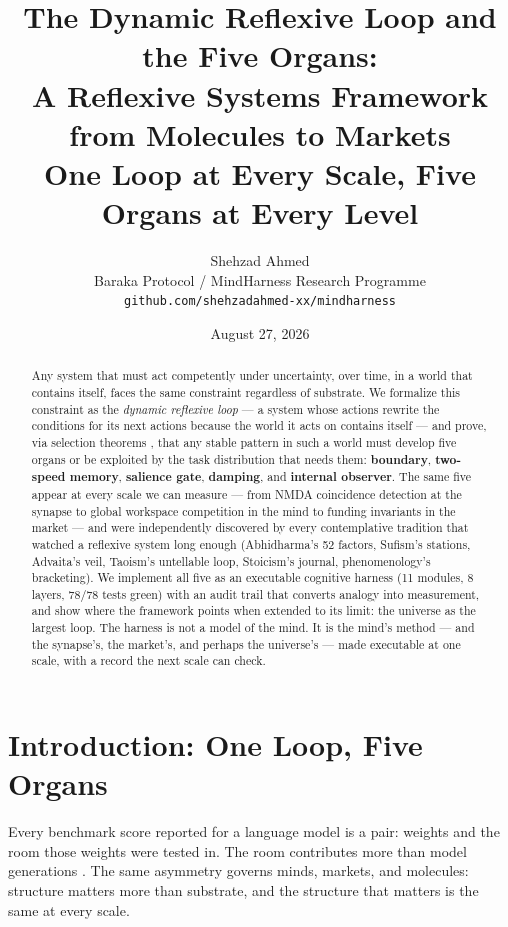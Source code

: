 \documentclass[11pt]{article}
\title{The Dynamic Reflexive Loop and the Five Organs:\\[4pt]
\Large A Reflexive Systems Framework from Molecules to Markets\\[6pt]
\normalsize One Loop at Every Scale, Five Organs at Every Level}
\author{Shehzad Ahmed \\ \small Baraka Protocol / MindHarness Research Programme \\ \small \texttt{github.com/shehzadahmed-xx/mindharness}}
\date{August 27, 2026}
\begin{document}
\maketitle

\begin{abstract}
Any system that must act competently under uncertainty, over time, in a world that contains itself, faces the same constraint regardless of substrate. We formalize this constraint as the \emph{dynamic reflexive loop} --- a system whose actions rewrite the conditions for its next actions because the world it acts on contains itself --- and prove, via selection theorems \citep{nayebi2026}, that any stable pattern in such a world must develop five organs or be exploited by the task distribution that needs them: \textbf{boundary}, \textbf{two-speed memory}, \textbf{salience gate}, \textbf{damping}, and \textbf{internal observer}. The same five appear at every scale we can measure --- from NMDA coincidence detection at the synapse to global workspace competition in the mind to funding invariants in the market --- and were independently discovered by every contemplative tradition that watched a reflexive system long enough (Abhidharma's 52 factors, Sufism's stations, Advaita's veil, Taoism's untellable loop, Stoicism's journal, phenomenology's bracketing). We implement all five as an executable cognitive harness (11 modules, 8 layers, 78/78 tests green) with an audit trail that converts analogy into measurement, and show where the framework points when extended to its limit: the universe as the largest loop. The harness is not a model of the mind. It is the mind's method --- and the synapse's, the market's, and perhaps the universe's --- made executable at one scale, with a record the next scale can check.
\end{abstract}

\section{Introduction: One Loop, Five Organs}

Every benchmark score reported for a language model is a pair: weights and the room those weights were tested in. The room contributes more than model generations \citep{lin2026ahe}. The same asymmetry governs minds, markets, and molecules: structure matters more than substrate, and the structure that matters is the same at every scale.
\end{document}
